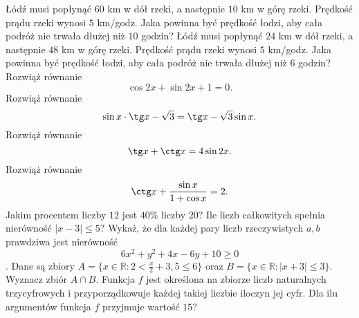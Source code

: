 Łódź musi popłynąć $60$ km w dół rzeki, a następnie $10$ km w górę rzeki. Prędkość prądu rzeki wynosi $5$ km/godz. Jaka powinna być prędkość łodzi, aby cała podróż nie trwała dłużej niż $10$ godzin?
Łódź musi popłynąć $24$ km w dół rzeki, a następnie $48$ km w górę rzeki. Prędkość prądu rzeki wynosi $5$ km/godz. Jaka powinna być prędkość łodzi, aby cała podróż nie trwała dłużej niż $6$ godzin?
Rozwiąż równanie $$ \cos 2x + \sin 2x +1 =0.$$
Rozwiąż równanie $$ \sin x\cdot\tg x -\sqrt{3}=\tg x -\sqrt{3}\sin x.$$
Rozwiąż równanie $$ \tg x + \ctg x =4\sin 2x.$$
Rozwiąż równanie $$ \ctg x + \frac{\sin x}{1+\cos x} =2.$$
Jakim procentem liczby $12$ jest $40\%$ liczby $20$?
Ile liczb całkowitych spełnia nierówność $|x-3|\leq 5$?
Wykaż, że dla każdej pary liczb rzeczywistych $a,b$ prawdziwa jest nierówność $$6x^2+y^2 +4x-6y+10\geq 0$$.
Dane są zbiory $A=\{x\in\mathbb{R}: 2<\frac{x}{2}+3,5\leq 6\}$ oraz $B=\{x\in\mathbb{R}:|x+3|\leq 3\}$. Wyznacz zbiór $A\cap B$.
Funkcja $f$ jest określona na zbiorze liczb naturalnych trzycyfrowych i przyporządkowuje każdej takiej liczbie iloczyn jej cyfr. Dla ilu argumentów funkcja $f$ przyjmuje wartość $15$? 
